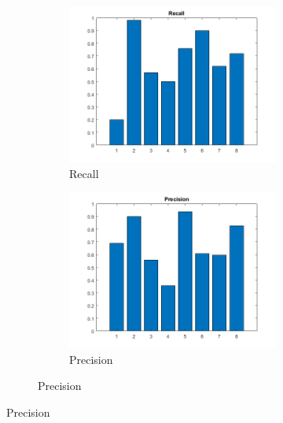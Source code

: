 \begin{figure}[h]
	\centering
	\begin{subfigure}{0.3\textwidth}
		\begin{subfigure}[t]{\textwidth}
			\includegraphics[width=\textwidth]{figures/recall_75C_21NN_2S.png} 
			\caption{Recall}
		\end{subfigure}
		\begin{subfigure}[t]{\textwidth}
			\includegraphics[width=\textwidth]{figures/precision_75C_21NN_2S.png}
			\caption{Precision}
		\end{subfigure}


\end{subfigure}
\end{figure}
